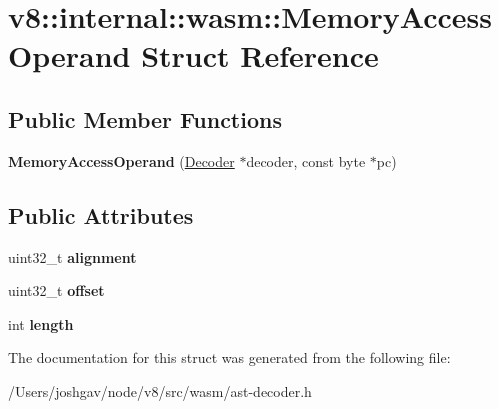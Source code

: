 \hypertarget{structv8_1_1internal_1_1wasm_1_1_memory_access_operand}{}\section{v8\+:\+:internal\+:\+:wasm\+:\+:Memory\+Access\+Operand Struct Reference}
\label{structv8_1_1internal_1_1wasm_1_1_memory_access_operand}
\subsection*{Public Member Functions}
\begin{DoxyCompactItemize}
\item 
{\bfseries Memory\+Access\+Operand} (\hyperlink{classv8_1_1internal_1_1wasm_1_1_decoder}{Decoder} $\ast$decoder, const byte $\ast$pc)\hypertarget{structv8_1_1internal_1_1wasm_1_1_memory_access_operand_a5044c647fbfecec4f63856f061498549}{}\label{structv8_1_1internal_1_1wasm_1_1_memory_access_operand_a5044c647fbfecec4f63856f061498549}

\end{DoxyCompactItemize}
\subsection*{Public Attributes}
\begin{DoxyCompactItemize}
\item 
uint32\+\_\+t {\bfseries alignment}\hypertarget{structv8_1_1internal_1_1wasm_1_1_memory_access_operand_a48f1927d76c41f474a9e0132da48f3d4}{}\label{structv8_1_1internal_1_1wasm_1_1_memory_access_operand_a48f1927d76c41f474a9e0132da48f3d4}

\item 
uint32\+\_\+t {\bfseries offset}\hypertarget{structv8_1_1internal_1_1wasm_1_1_memory_access_operand_a31b089ca97eb69afa3cdce3e89f26e98}{}\label{structv8_1_1internal_1_1wasm_1_1_memory_access_operand_a31b089ca97eb69afa3cdce3e89f26e98}

\item 
int {\bfseries length}\hypertarget{structv8_1_1internal_1_1wasm_1_1_memory_access_operand_a2ba2d0d458c40eda88930e020babd6b1}{}\label{structv8_1_1internal_1_1wasm_1_1_memory_access_operand_a2ba2d0d458c40eda88930e020babd6b1}

\end{DoxyCompactItemize}


The documentation for this struct was generated from the following file\+:\begin{DoxyCompactItemize}
\item 
/\+Users/joshgav/node/v8/src/wasm/ast-\/decoder.\+h\end{DoxyCompactItemize}
